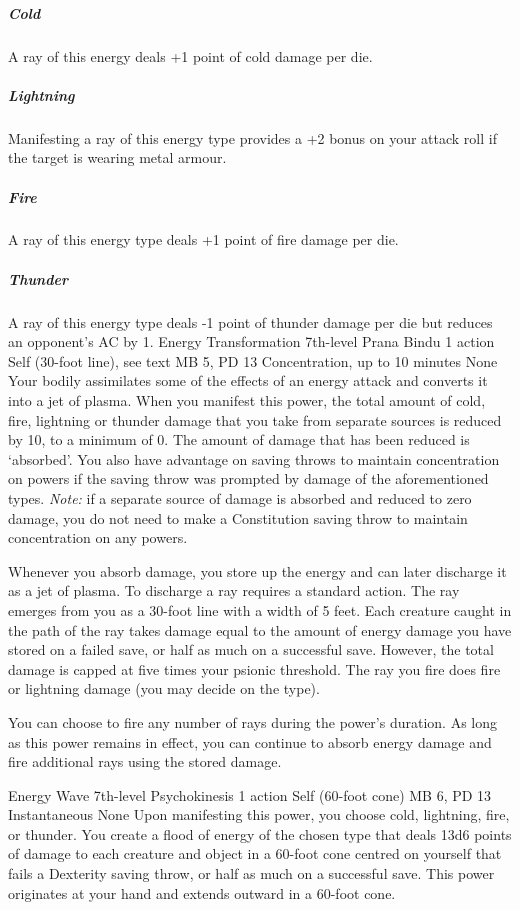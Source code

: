 \subparagraph{Cold}
  A ray of this energy deals +1 point of cold damage per die.

\subparagraph{Lightning}
  Manifesting a ray of this energy type provides a
  +2 bonus on your attack roll if the target is wearing metal armour.

\subparagraph{Fire}
  A ray of this energy type deals +1 point of fire damage per die.

\subparagraph{Thunder}
  A ray of this energy type deals -1 point of thunder damage per die
  but reduces an opponent's AC by 1.
\DndPowerHeader%
    {Energy Transformation\label{pwr:energy-transformation}}
    {7th-level Prana Bindu}
    {1 action}
    {Self (30-foot line), see text}
    {MB 5, PD 13}
    {Concentration, up to 10 minutes}
    {None}
Your bodily assimilates some of the effects
of an energy attack and converts it into a jet of plasma.
When you manifest this power, the total amount of cold, fire,
lightning or thunder damage that you take from separate sources
is reduced by 10, to a minimum of 0. The amount of damage
that has been reduced is `absorbed'. You also have advantage
on saving throws to maintain concentration on powers if the
saving throw was prompted by damage of the aforementioned
types. \emph{Note:} if a separate source of damage is absorbed
and reduced to zero damage,
you do not need to make a Constitution saving throw
to maintain concentration on any powers.

Whenever you absorb damage, you store up the energy and can
later discharge it as a jet of plasma. To discharge a ray
requires a standard action. The ray emerges from you as a
30-foot line with a width of 5 feet. Each creature caught
in the path of the ray takes damage equal to the amount of
energy damage you have stored on a failed save, or half as
much on a successful save. However, the total damage is capped
at five times your psionic threshold. The ray you fire
does fire or lightning damage (you may decide on the type).

You can choose to fire any number of rays during the power's
duration. As long as this power remains in effect, you can
continue to absorb energy damage and fire additional rays
using the stored damage.

\DndPowerHeader%
    {Energy Wave\label{pwr:energy-wave}}
    {7th-level Psychokinesis}
    {1 action}
    {Self (60-foot cone)}
    {MB 6, PD 13}
    {Instantaneous}
    {None}
Upon manifesting this power,
you choose cold, lightning, fire, or thunder.
You create a flood of energy of the chosen type
that deals 13d6 points of damage
to each creature and object in a 60-foot cone
centred on yourself that fails a Dexterity saving throw,
or half as much on a successful save.
This power originates at your hand
and extends outward in a 60-foot cone.

